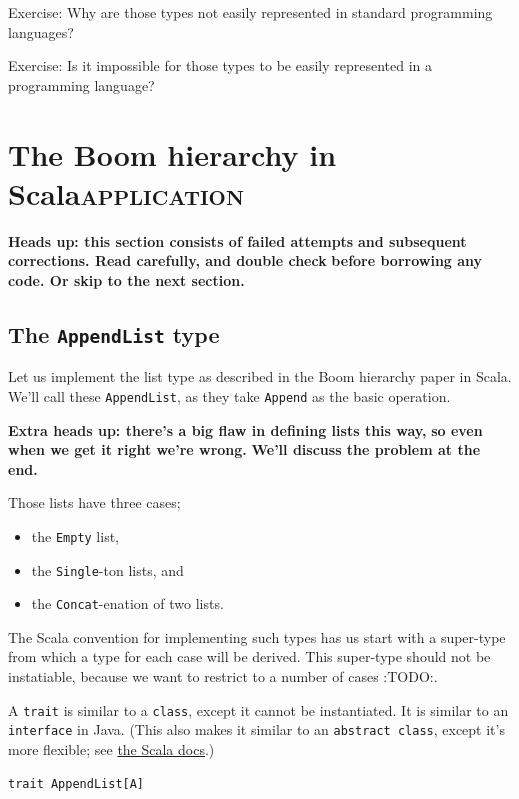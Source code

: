 \documentclass[11pt]{article}
\begin{document}
Exercise: Why are those types not easily represented in standard
programming languages?

Exercise: Is it impossible for those types to be easily represented
in a programming language?

\section{The Boom hierarchy in Scala\hfill{}\textsc{application}}
\label{sec:org72c6e31}
\begin{center}
\textbf{Heads up: this section consists of failed attempts}
\textbf{and subsequent corrections. Read carefully, and double check}
\textbf{before borrowing any code. Or skip to the next section.}
\end{center}

\subsection{The \texttt{AppendList} type}
\label{sec:org9ba44a3}
Let us implement the list type as described in the Boom hierarchy paper
in Scala. We'll call these \texttt{AppendList}, as they take \texttt{Append} as
the basic operation.

\begin{center}
\textbf{Extra heads up: there's a big flaw in defining lists this way,}
\textbf{so even when we get it right we're wrong.}
\textbf{We'll discuss the problem at the end.}
\end{center}

Those lists have three cases;
\begin{itemize}
\item the \texttt{Empty} list,
\item the \texttt{Single}-ton lists, and
\item the \texttt{Concat}-enation of two lists.
\end{itemize}

The Scala convention for implementing such types
has us start with a super-type from which a type
for each case will be derived.
This super-type should not be instatiable,
because we want to restrict to a number of cases :TODO:.

A \texttt{trait} is similar to a \texttt{class}, except it cannot be instantiated.
It is similar to an \texttt{interface} in Java.
(This also makes it similar to an \texttt{abstract class},
except it's more flexible; see
\href{https://docs.scala-lang.org/overviews/scala-book/abstract-classes.html}{the Scala docs}.)
\begin{verbatim}
trait AppendList[A]
\end{verbatim}
\end{document}
